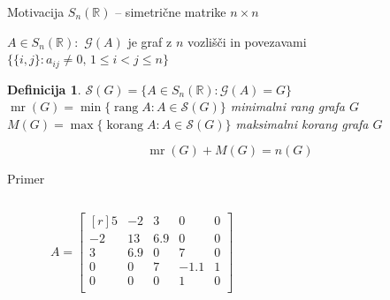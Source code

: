 \documentclass{beamer}
\newtheorem{definicija}{Definicija}
\newcommand{\R}{\ensuremath{\mathbb{R}}}
\DeclareMathOperator{\rang}{rang}
\DeclareMathOperator{\korang}{korang}
\DeclareMathOperator{\mr}{mr}
\begin{document}
\begin{frame}{Motivacija}
    $S_n(\R)$ -- simetrične matrike $n\times n$
    
    \medskip
    
    $A \in S_n(\R) \colon$
    $\mathcal{G}(A)$ je graf z $n$ vozlišči in povezavami $\{\{i,j\}\colon a_{ij} \neq 0,\, 1 \leq i < j \leq n \} $
    
    \medskip
    \begin{definicija}
        $\mathcal{S}(G) = \{ A \in S_n(\R)\colon \mathcal{G}(A) = G \} $ \\
        $\mr(G) = \min \{ \rang A \colon A \in \mathcal{S}(G) \}$ \alert{minimalni rang} grafa $G$
        $M(G) = \max \{ \korang A \colon A \in \mathcal{S}(G) \}$ \alert{maksimalni korang} grafa $G$
    \end{definicija}
    
    \[ \mr(G) + M(G) = n(G) \]
\end{frame}

\begin{frame}{Primer}
    \begin{columns}
        \begin{column}{0.49\textwidth}
            \[ A = \begin{bmatrix*}[r]
            5 & -2 & 3 & 0 & 0 \\
            -2 & 13 & 6.9 & 0 & 0 \\
            3 & 6.9 & 0 & 7 & 0 \\
            0 & 0 & 7 & -1.1 & 1 \\
            0 & 0 & 0 & 1 & 0 \\
            \end{bmatrix*}\]
        \end{column}
        
        \begin{column}{0.5\textwidth}
            \begin{figure}
                \centering
            \end{figure}
        \end{column}
    \end{columns}
\end{frame}
\end{document}
